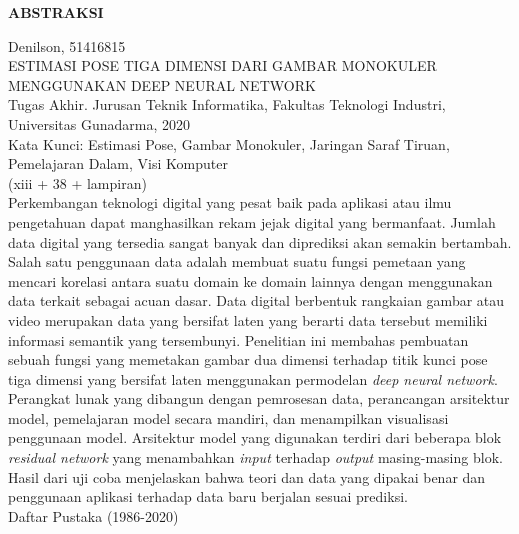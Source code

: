\newpage %
\begin{center}
    \begin{large}\textbf{ABSTRAKSI}\end{large}
\end{center}

\vspace{5mm}

\noindent Denilson, 51416815 \\
ESTIMASI POSE TIGA DIMENSI DARI GAMBAR MONOKULER MENGGUNAKAN DEEP NEURAL NETWORK\\
Tugas Akhir. Jurusan Teknik Informatika, Fakultas Teknologi Industri, \\
Universitas Gunadarma, 2020\\
Kata Kunci: Estimasi Pose, Gambar Monokuler, Jaringan Saraf Tiruan, Pemelajaran Dalam, Visi Komputer\\
\noindent (xiii + 38 + lampiran)\\

Perkembangan teknologi digital yang pesat baik pada aplikasi atau ilmu pengetahuan dapat
manghasilkan rekam jejak digital yang bermanfaat. Jumlah data digital yang tersedia sangat
banyak dan diprediksi akan semakin bertambah. Salah satu penggunaan data adalah membuat
suatu fungsi pemetaan yang mencari korelasi antara suatu domain ke domain lainnya dengan
menggunakan data terkait sebagai acuan dasar. Data digital berbentuk rangkaian gambar atau video
merupakan data yang bersifat laten yang berarti data tersebut memiliki informasi semantik yang
tersembunyi. Penelitian ini membahas pembuatan sebuah fungsi yang memetakan gambar dua dimensi
terhadap titik kunci pose tiga dimensi yang bersifat laten menggunakan permodelan
\textit{deep neural network}. Perangkat lunak yang dibangun dengan pemrosesan data,
perancangan arsitektur model, pemelajaran model secara mandiri, dan menampilkan visualisasi
penggunaan model. Arsitektur model yang digunakan terdiri dari beberapa blok \textit{residual network}
yang menambahkan \textit{input} terhadap \textit{output} masing-masing blok. Hasil dari uji coba menjelaskan
bahwa teori dan data yang dipakai benar dan penggunaan aplikasi terhadap data baru berjalan
sesuai prediksi.\\


\noindent Daftar Pustaka (1986-2020)
